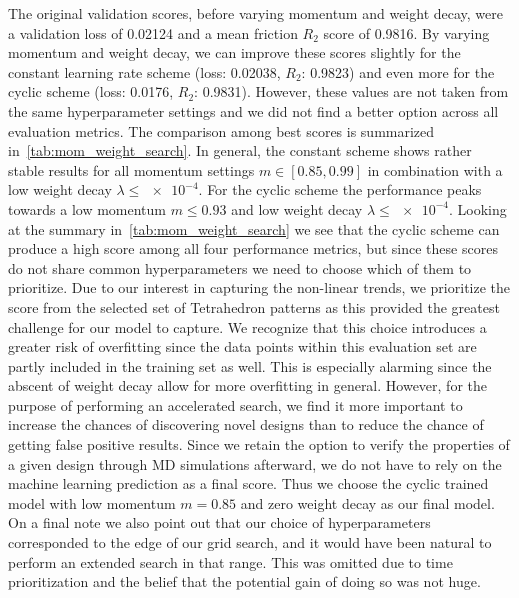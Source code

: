 The original validation scores, before varying momentum and weight decay, were a
validation loss of 0.02124 and a mean friction $R_2$ score of 0.9816. By varying
momentum and weight decay, we can improve these scores slightly for the constant
learning rate scheme (loss: 0.02038, $R_2$: 0.9823) and even more for the cyclic
scheme (loss: 0.0176, $R_2$: 0.9831). However, these values are not taken from the same hyperparameter settings and we did not find a better option across all evaluation metrics. The comparison among best scores is
summarized in~\cref{tab:mom_weight_search}. In general, the constant scheme
shows rather stable results for all momentum settings $m \in [0.85, 0.99]$ in
combination with a low weight decay $\lambda \le \num{e-4}$. For the cyclic scheme
the performance peaks towards a low momentum $m \le 0.93$ and low weight decay
$\lambda \le \num{e-4}$. Looking at the summary in~\cref{tab:mom_weight_search} we
see that the cyclic scheme can produce a high score among all four
performance metrics, but since these scores do not share common hyperparameters we need to choose which of them to prioritize. Due to our interest in capturing the non-linear trends, we prioritize the score from the
selected set of Tetrahedron patterns as this provided the greatest challenge for our model to capture. We recognize that this choice introduces a greater risk of
overfitting since the data points within this evaluation set are partly included in the training set as well. This is especially alarming since the abscent of weight decay allow for more overfitting in general. However, for the purpose of performing an accelerated search, we find it more important to increase the chances of discovering novel designs than to reduce the chance of getting false positive results. Since we retain the option to verify the properties of a given design through \acrshort{MD} simulations afterward, we do not have to rely on the machine learning prediction as a final score. Thus we choose the cyclic trained model with low momentum $m = 0.85$ and zero weight decay as our final model. On a final note we also point out that our choice of hyperparameters corresponded to the edge of our grid search, and it would have been natural to perform an extended search in that range. This was omitted due to time prioritization and the belief that the potential gain of doing so was not huge.


